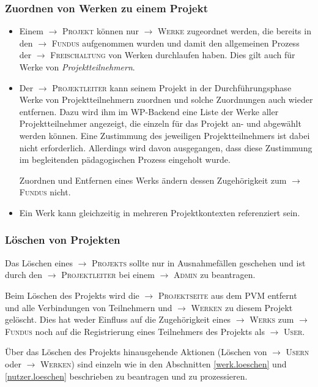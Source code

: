 \documentclass[a4paper,11pt]{article}
\newcommand{\glossar}[1]{{$\to$ \textsc{#1}}}
\begin{document}
\subsubsection{Zuordnen von Werken zu einem Projekt}

\begin{itemize}
\item Einem \glossar{Projekt} können nur \glossar{Werke} zugeordnet werden,
  die bereits in den \glossar{Fundus} aufgenommen wurden und damit den
  allgemeinen Prozess der \glossar{Freischaltung} von Werken durchlaufen
  haben.  Dies gilt auch für Werke von \emph{Projektteilnehmern}.

\item Der \glossar{Projektleiter} kann seinem Projekt in der Durchführungsphase
  Werke von Projektteilnehmern zuordnen und solche Zuordnungen auch wieder
  entfernen.  Dazu wird ihm im WP-Backend eine Liste der Werke aller
  Projektteilnehmer angezeigt, die einzeln für das Projekt an- und abgewählt
  werden können.  Eine Zustimmung des jeweiligen Projektteilnehmers ist dabei
  nicht erforderlich.  Allerdings wird davon ausgegangen, dass diese Zustimmung
  im begleitenden pädagogischen Prozess eingeholt wurde.

  Zuordnen und Entfernen eines Werks ändern dessen Zugehörigkeit zum
  \glossar{Fundus} nicht.

\item Ein Werk kann gleichzeitig in mehreren Projektkontexten referenziert
  sein.

\end{itemize}

\subsubsection{Löschen von Projekten}

Das Löschen eines \glossar{Projekts} sollte nur in Ausnahmefällen geschehen
und ist durch den \glossar{Projektleiter} bei einem \glossar{Admin} zu
beantragen.

Beim Löschen des Projekts wird die \glossar{Projektseite} aus dem PVM entfernt
und alle Verbindungen von Teilnehmern und \glossar{Werken} zu diesem Projekt
gelöscht.  Dies hat weder Einfluss auf die Zugehörigkeit eines \glossar{Werks}
zum \glossar{Fundus} noch auf die Registrierung eines Teilnehmers des Projekts
als \glossar{User}.

Über das Löschen des Projekts hinausgehende Aktionen (Löschen von
\glossar{Usern} oder \glossar{Werken}) sind einzeln wie in den Abschnitten
\ref{werk.loeschen} und \ref{nutzer.loeschen} beschrieben zu beantragen und zu
prozessieren.
\end{document}
